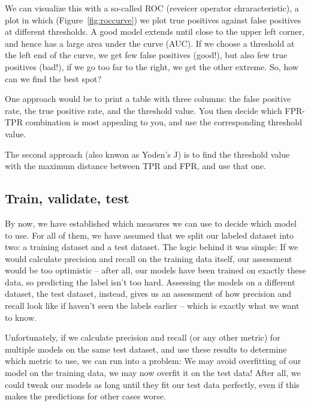 We can visualize this with a so-called ROC (reveicer operator
chraracteristic), a plot in which (Figure~\ref{fig:roccurve}) we plot
true positives against false positives at different thresholds.  A
good model extends until close to the upper left corner, and hence has
a large area under the curve (AUC).  If we choose a threshold at the
left end of the curve, we get few false positives (good!), but also
few true positives (bad!), if we go too far to the right, we get
the other extreme. So, how can we find the best spot?

One approach would be to print a table with three columns: the false
positive rate, the true positive rate, and the threshold value. You
then decide which FPR-TPR combination is most appealing to you, and
use the corresponding threshold value.

The second approach (also knwon as Yoden's J) is to find the threshold
value with the maximum distance between TPR and FPR, and use that one.




\subsection{Train, validate, test}
By now, we have established which measures we can use to decide which
model to use. For all of them, we have assumed that we split our
labeled dataset into two: a training dataset and a test dataset. The
logic behind it was simple: If we would calculate precision and recall
on the training data itself, our assessment would be too optimistic --
after all, our models have been trained on exactly these data, so
predicting the label isn't too hard. Assessing the models on a different
dataset, the test dataset, instead, gives us an assessment of how
precision and recall look like if haven't seen the labels earlier --
which is exactly what we want to know.

Unfortunately, if we calculate precision and recall (or any other
metric) for multiple models on the same test dataset, and use these
results to determine which metric to use, we can run into a problem:
We may avoid overfitting of our model on the training data, we may now
overfit it on the test data! After all, we could tweak our models as
long until they fit our test data perfectly, even if this makes the
predictions for other cases worse.

